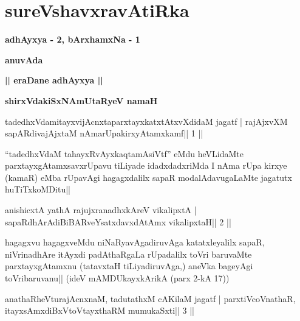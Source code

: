 \chapter{sureVshavxravAtiRka}

\begin{center}
{\Large\textbf{adhAyxya - 2, bArxhamxNa - 1}}
\medskip

{\large\textbf{anuvAda}}
\medskip

{\large\textbf{|| eraDane adhAyxya ||}}
\end{center}

\begin{center}
\centerline{\bf shirxVdakiSxNAmUtaRyeV namaH}
\medskip
\end{center}


\begin{shl}
tadedhxVdamitayxvijAcnxtaparxtayxkatxtAtxvXdidaM jagatf |
rajAjxvXM sapARdivajAjxtaM nAmarUpakirxyAtamxkamf\hfill || 1 ||
\end{shl}

\begin{artha}
``tadedhxVdaM tahayxRvAyxkaqtamAsiVtf'' eMdu heVLidaMte parxtayxgAtamxsavxrUpavu tiLiyade idadxdadxriMda I nAma rUpa kirxye (kamaR) eMba rUpavAgi hagagxdalilx sapaR modalAdavugaLaMte jagatutx huTiTxkoMDitu||
\end{artha} 
 

\begin{shl}
anishicxtA yathA rajujxranadhxkAreV vikalipxtA |
sapaRdhArAdiBiBARveYsatxdavxdAtAmx vikalipxtaH\hfill || 2 ||
\end{shl}

\begin{artha}
hagagxvu hagagxveMdu niNaRyavAgadiruvAga katatxleyalilx sapaR, 
niVrinadhAre itAyxdi padAthaRgaLa rUpadalilx toVri baruvaMte 
parxtayxgAtamxnu (tatavxtaH tiLiyadiru\-vAga,) aneVka bageyAgi 
toVribaruvanu|| (ideV mAMDUkayxkArikA (parx 2-kA 17)) 
\end{artha}


\begin{shl}
anathaRheVturajAcnxnaM, tadutathxM cAKilaM jagatf |
parxtiVcoV\s nathaR, itayxsAmxdiBxVtoV\s tayxthaRM mumukaSxti\hfill || 3 ||
\end{shl}

